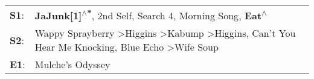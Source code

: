 \begin{supertabular}{p{0.03\textwidth}p{0.92\textwidth}}
 \textbf{S1}:  &                                                                                                                 \textbf{JaJunk[1]\textsuperscript{$\wedge$*}}, \enspace 2nd Self\textsuperscript{}, \enspace Search 4\textsuperscript{}, \enspace Morning Song\textsuperscript{}, \enspace \textbf{Eat\textsuperscript{$\wedge$}}  \enspace  \\
 \textbf{S2}:  &  Wappy Sprayberry\textsuperscript{} \textgreater \enspace Higgins\textsuperscript{} \textgreater \enspace Kabump\textsuperscript{} \textgreater \enspace Higgins\textsuperscript{}, \enspace Can't You Hear Me Knocking\textsuperscript{}, \enspace Blue Echo\textsuperscript{} \textgreater \enspace Wife Soup\textsuperscript{}  \enspace  \\
 \textbf{E1}:  &                                                                                                                                                                                                                                                                                                Mulche's Odyssey\textsuperscript{}  \enspace  \\
\end{supertabular}
